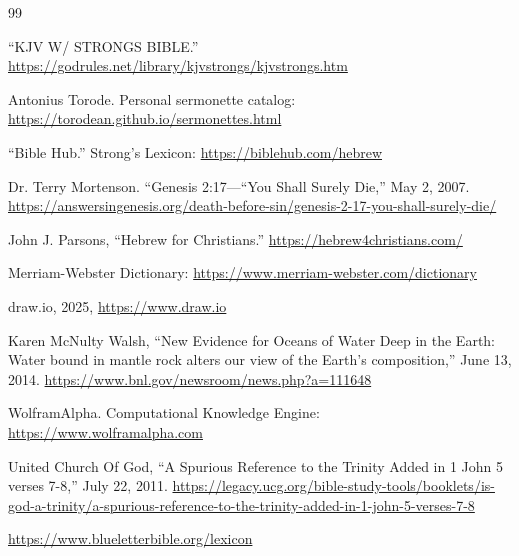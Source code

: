 {\footnotesize
\begin{thebibliography}{99}
	
	 ``KJV W/ STRONGS BIBLE.'' \url{https://godrules.net/library/kjvstrongs/kjvstrongs.htm}
	
	 Antonius Torode. Personal sermonette catalog: \url{https://torodean.github.io/sermonettes.html}
	
	 ``Bible Hub.'' Strong's Lexicon: \url{https://biblehub.com/hebrew}
	
	 Dr. Terry Mortenson. ``Genesis 2:17—“You Shall Surely Die,'' May 2, 2007.  \url{https://answersingenesis.org/death-before-sin/genesis-2-17-you-shall-surely-die/}
	
	 John J. Parsons, ``Hebrew for Christians.'' \url{https://hebrew4christians.com/}
	
	 Merriam-Webster Dictionary: \url{https://www.merriam-webster.com/dictionary}
	
	 draw.io, 2025, \url{https://www.draw.io}
	
	 Karen McNulty Walsh, ``New Evidence for Oceans of Water Deep in the Earth: Water bound in mantle rock alters our view of the Earth's composition,'' June 13, 2014. \url{https://www.bnl.gov/newsroom/news.php?a=111648}
	
	 WolframAlpha. Computational Knowledge Engine: \url{https://www.wolframalpha.com}
	
	 United Church Of God, ``A Spurious Reference to the Trinity Added in 1 John 5 verses 7-8,'' July 22, 2011. \url{https://legacy.ucg.org/bible-study-tools/booklets/is-god-a-trinity/a-spurious-reference-to-the-trinity-added-in-1-john-5-verses-7-8}
	
	 \url{https://www.blueletterbible.org/lexicon}
	
\end{thebibliography}
}